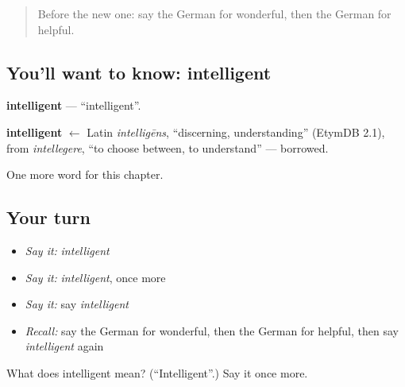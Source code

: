 \label{lesson:GE-C216-intelligent}



\begin{quote}
Before the new one: say the German for wonderful, then the German for helpful.
\end{quote}

\subsection*{You'll want to know: intelligent}
\textbf{intelligent} — \textquotedblleft{}intelligent\textquotedblright{}.

\begin{cousinweb}
\textbf{intelligent} $\leftarrow$ Latin \emph{intelligēns}, \textquotedblleft{}discerning, understanding\textquotedblright{} (EtymDB 2.1), from \emph{intellegere}, \textquotedblleft{}to choose between, to understand\textquotedblright{} — borrowed.
\end{cousinweb}

\begin{grammarlens}[title={What you've built}]
One more word for this chapter.
\end{grammarlens}

\subsection*{Your turn}
\begin{itemize}
\raggedright
  \item \emph{Say it:} \emph{intelligent}
  \item \emph{Say it:} \emph{intelligent}, once more
  \item \emph{Say it:} say \emph{intelligent}
  \item \emph{Recall:} say the German for wonderful, then the German for helpful, then say \emph{intelligent} again
\end{itemize}

\begin{tcolorbox}[breakable,colback=teal!4,colframe=teal!35!black,title={Before you move on}]
What does intelligent mean? (\textquotedblleft{}Intelligent\textquotedblright{}.) Say it once more.
\end{tcolorbox}
